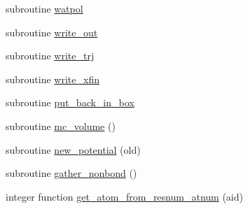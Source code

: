 \begin{DoxyCompactItemize}
\item 
subroutine \hyperlink{classmd_aa04bafc380523029ddc24d4dbc35ffcd}{watpol}
\item 
subroutine \hyperlink{classmd_a7ae57adec77c83a4e3684cfbf301d605}{write\-\_\-out}
\item 
subroutine \hyperlink{classmd_aed5ba254d7284a94bdac6e46d00e12de}{write\-\_\-trj}
\item 
subroutine \hyperlink{classmd_ad8ada800049df7345cd0a0e596644cc5}{write\-\_\-xfin}
\item 
subroutine \hyperlink{classmd_a319c186691d0dac294362e03c6e6404a}{put\-\_\-back\-\_\-in\-\_\-box}
\item 
subroutine \hyperlink{classmd_a4626201196d1fd44ddd1d0dae60902f1}{mc\-\_\-volume} ()
\item 
subroutine \hyperlink{classmd_a257734edbeff3a68b85a2e22d458f694}{new\-\_\-potential} (old)
\item 
subroutine \hyperlink{classmd_a5cf829ef511afd1e672036dca0192484}{gather\-\_\-nonbond} ()
\item 
integer function \hyperlink{classmd_a39817773df2b4230b655aef23f5be9c3}{get\-\_\-atom\-\_\-from\-\_\-resnum\-\_\-atnum} (aid)
\end{DoxyCompactItemize}

